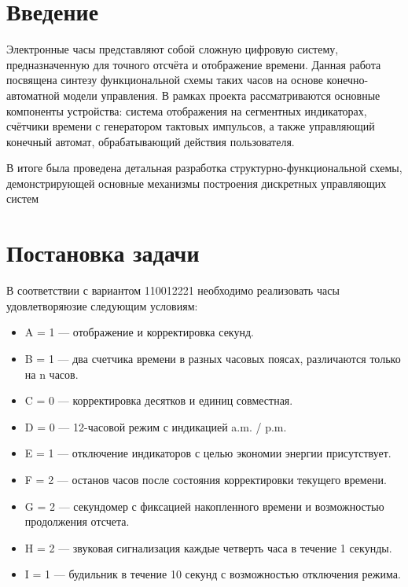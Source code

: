 \documentclass[11pt,a4paper,final]{article}
\begin{document}
	
	\newpage
	\tableofcontents
	
	\newpage
	\section* {Введение}
	Электронные часы представляют собой сложную цифровую систему, предназначенную для точного отсчёта и отображение времени. Данная работа посвящена синтезу функциональной схемы таких часов на основе конечно-автоматной модели управления. В рамках проекта рассматриваются основные компоненты устройства: система отображения на сегментных индикаторах, счётчики времени с генератором тактовых импульсов, а также управляющий конечный автомат, обрабатывающий действия пользователя.
	
	 В итоге была проведена детальная разработка структурно-функциональной схемы, демонстрирующей основные механизмы построения дискретных управляющих систем
	 
	 \newpage
	 \section{Постановка задачи}
	 
	 В соответствии с вариантом 110012221 необходимо реализовать часы удовлетворяюзие следующим условиям:
	 
	 \begin{itemize}
	 	\item A = 1 — отображение и корректировка секунд.
	 	\item B = 1 — два счетчика времени в разных часовых поясах, различаются только на n часов.
	 	\item C = 0 — корректировка десятков и единиц совместная.
	 	\item D = 0 — 12-часовой режим с индикацией a.m. / p.m.
	 	\item E = 1 — отключение индикаторов с целью экономии энергии присутствует.
	 	\item F = 2 — останов часов после состояния корректировки текущего времени.
	 	\item G = 2 — секундомер с фиксацией накопленного времени и возможностью продолжения отсчета.
	 	\item H = 2 — звуковая сигнализация каждые четверть часа в течение 1 секунды.
	 	\item I = 1 — будильник в течение 10 секунд с возможностью отключения режима.
	 \end{itemize}
	 
\end{document}
